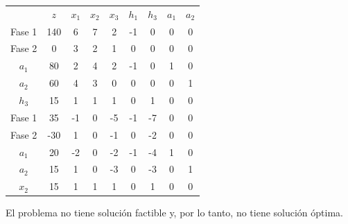 \begin{enumerate}
       \begin{center}
\begin{tabular}{c|c|ccccccc|}
 & $z$ & $x_1$ & $x_2$ & $x_3$ & $h_1$ & $h_3$ & $a_1$ & $a_2$\\ 
Fase 1 & 140 & 6 & 7 & 2 & -1 & 0 & 0 & 0 \\ 
Fase 2 & 0 & 3 & 2 & 1 & 0 & 0 & 0 & 0 \\ 
\hline
$a_1$ & 80  & 2 & 4 & 2 & -1 & 0 & 1 & 0\\ 
$a_2$ & 60  & 4 & 3 & 0 & 0 & 0 & 0 & 1\\ 
$h_3$ & 15  & 1 & 1 & 1 & 0 & 1 & 0 & 0\\ 
\hline
Fase 1 & 35 & -1 & 0 & -5 & -1 & -7 & 0 & 0 \\ 
Fase 2 & -30 & 1 & 0 & -1 & 0 & -2 & 0 & 0 \\ 
\hline
$a_1$ & 20  & -2 & 0 & -2 & -1 & -4 & 1 & 0\\ 
$a_2$ & 15  & 1 & 0 & -3 & 0 & -3 & 0 & 1\\ 
$x_2$ & 15  & 1 & 1 & 1 & 0 & 1 & 0 & 0\\ 
\hline
\end{tabular}
\end{center}

El problema no tiene solución factible y, por lo tanto, no tiene solución óptima.

    
    \end{enumerate}





